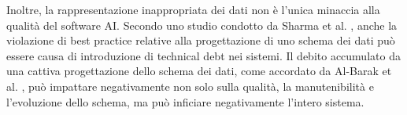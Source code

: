 Inoltre, la rappresentazione inappropriata dei dati non è l'unica minaccia alla qualità del software AI. Secondo uno studio condotto da Sharma et al. \cite{SharmaDBSmells}, anche la violazione di best practice relative alla progettazione di uno schema dei dati può essere causa di introduzione di technical debt nei sistemi. 
Il debito accumulato da una cattiva progettazione dello schema dei dati, come accordato da Al-Barak et al. \cite{Al-BarakDBDebt}, può impattare negativamente non solo sulla qualità, la manutenibilità e l'evoluzione dello schema, ma può inficiare negativamente l'intero sistema.
